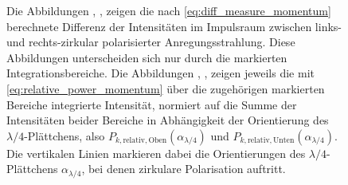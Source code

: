 \documentclass[a4paper, titlepage,  ngerman]{book}
\begin{document}
\begin{figure}
			\caption[Differenz- und Integrationsdaten PSHE Impulsraum]{Die Abbildungen , ,  zeigen die nach \eqref{eq:diff_measure_momentum} berechnete Differenz der Intensitäten im Impulsraum zwischen links- und rechts-zirkular polarisierter Anregungsstrahlung. Diese Abbildungen unterscheiden sich nur durch die markierten Integrationsbereiche. Die Abbildungen , ,  zeigen jeweils die mit \eqref{eq:relative_power_momentum} über die zugehörigen markierten Bereiche integrierte Intensität, normiert auf die Summe der Intensitäten beider Bereiche in Abhängigkeit der Orientierung des $\lambda/4$-Plättchens, also $P_{k, \mathrm{relativ}, \mathrm{Oben}}(\alpha_{\lambda/4})$ und $P_{k, \mathrm{relativ}, \mathrm{Unten}}(\alpha_{\lambda/4})$. Die vertikalen Linien markieren dabei die Orientierungen des $\lambda/4$-Plättchens $\alpha_{\lambda/4}$, bei denen zirkulare Polarisation auftritt.}	
			\label{fig:spin_hall_measure}	
		\end{figure}
\end{document}
